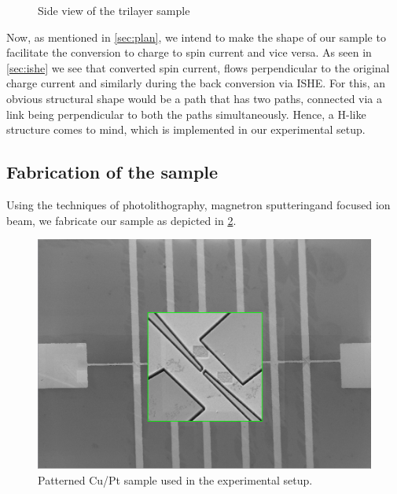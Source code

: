 \begin{figure}
    \centering
{}
    \caption{Side view of the trilayer sample}
    \label{fig:layers}
\end{figure}

Now, as mentioned in \cref{sec:plan}, we intend to make the shape of our sample to facilitate the conversion to charge to spin current and vice versa.
As seen in \cref{sec:ishe} we see that converted spin current, flows perpendicular to the original charge current and similarly during the back conversion via ISHE.
For this, an obvious structural shape would be a path that has two paths, connected via a link being perpendicular to both the paths simultaneously.
Hence, a \textsc{H}-like structure comes to mind, which is implemented in our experimental setup.

\subsection{Fabrication of the sample}

Using the techniques of photolithography\footnotemark, magnetron sputtering\footnotemark[\value{footnote}] and focused ion beam\footnotemark[\value{footnote}], we fabricate our sample as depicted in \cref{fig:fabrication-sample}.

\begin{figure}
    \centering
    \includegraphics[scale=0.35]{newtrack.png}
    \caption{Patterned Cu/Pt sample used in the experimental setup.}
    \label{fig:fabrication-sample}
\end{figure}


